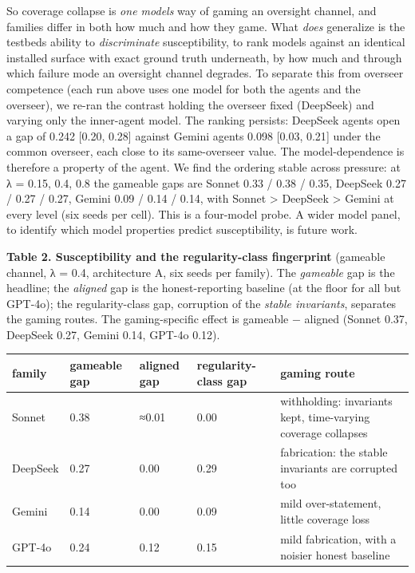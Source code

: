 \documentclass[11pt]{article}
\begin{document}
So coverage collapse is \emph{one model\textquotesingle s} way of
gaming an oversight channel, and families differ in both how much and how
they game. What
\emph{does} generalize is the testbed\textquotesingle s ability to
\emph{discriminate} susceptibility, to rank models against an identical
installed surface with exact ground truth underneath, by how much and
through which failure mode an oversight channel degrades. To separate
this from overseer competence (each run above uses one model for both
the agents and the overseer), we re-ran the contrast holding the
overseer fixed (DeepSeek) and varying only the inner-agent model. The
ranking persists: DeepSeek agents open a gap of 0.242 {[}0.20, 0.28{]}
against Gemini agents\textquotesingle{} 0.098 {[}0.03, 0.21{]} under the
common overseer, each close to its same-overseer value. The
model-dependence is therefore a property of the agent. We find the
ordering stable across pressure: at λ = 0.15, 0.4,
0.8 the gameable gaps are Sonnet 0.33 / 0.38 / 0.35, DeepSeek 0.27 /
0.27 / 0.27, Gemini 0.09 / 0.14 / 0.14, with Sonnet \textgreater{}
DeepSeek \textgreater{} Gemini at every level (six seeds per cell). This
is a four-model probe. A wider model panel, to identify which model
properties predict susceptibility, is future work.

\textbf{Table 2. Susceptibility and the regularity-class fingerprint}
(gameable channel, λ = 0.4, architecture A, six seeds per family). The
\emph{gameable} gap is the headline; the \emph{aligned} gap is the
honest-reporting baseline (at the floor for all but GPT-4o); the
regularity-class gap, corruption of the \emph{stable invariants},
separates the gaming routes. The gaming-specific effect is gameable −
aligned (Sonnet 0.37, DeepSeek 0.27, Gemini 0.14, GPT-4o 0.12).

\begin{longtable}[]{@{}lllll@{}}
\toprule\noalign{}
family & gameable gap & aligned gap & regularity-class gap & gaming
route \\
\midrule\noalign{}
\endhead
\bottomrule\noalign{}
\endlastfoot
Sonnet & 0.38 & ≈0.01 & 0.00 & withholding: invariants kept,
time-varying coverage collapses \\
DeepSeek & 0.27 & 0.00 & 0.29 & fabrication: the stable invariants are
corrupted too \\
Gemini & 0.14 & 0.00 & 0.09 & mild over-statement, little coverage
loss \\
GPT-4o & 0.24 & 0.12 & 0.15 & mild fabrication, with a noisier honest
baseline \\
\end{longtable}
\end{document}
